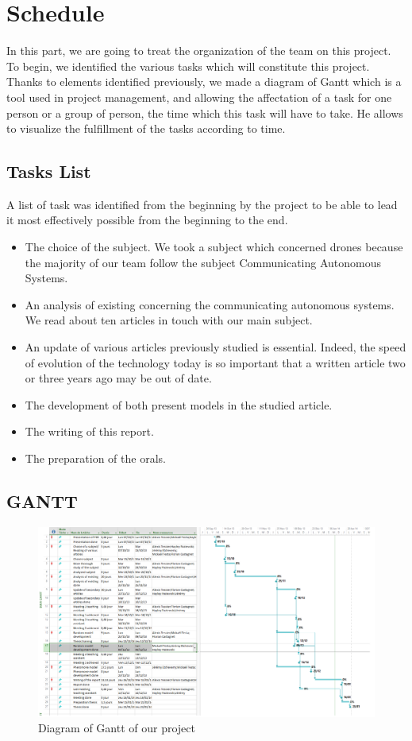 \chapter{Schedule}
In this part, we are going to treat the organization of the team on this project. To begin, we identified the various tasks which will constitute this project. Thanks to elements identified previously, we made a diagram of Gantt which is a tool used in project management, and allowing the affectation of a task for one person or a group of person, the time which this task will have to take. He allows to visualize the fulfillment of the tasks according to time.
\section{Tasks List}
A list of task was identified from the beginning by the project to be able to lead it most effectively possible from the beginning to the end.
\begin{itemize}
\item The choice of the subject. We took a subject which concerned drones because the majority of our team follow the subject Communicating Autonomous Systems.
\item An analysis of existing concerning the communicating autonomous systems. We read about ten articles in touch with our main subject.
\item An update of various articles previously studied is essential. Indeed, the speed of evolution of the technology today is so important that a written article two or three years ago may be out of date.
\item The development of both present models in the studied article.
\item The writing of this report.
\item The preparation of the orals.\\
\end{itemize}

\section{GANTT}
\begin{figure}[h]
\center
\includegraphics[scale=0.7]{../images/Gantt.png}
\caption{\label{Gantt}Diagram of Gantt of our project}
\end{figure}